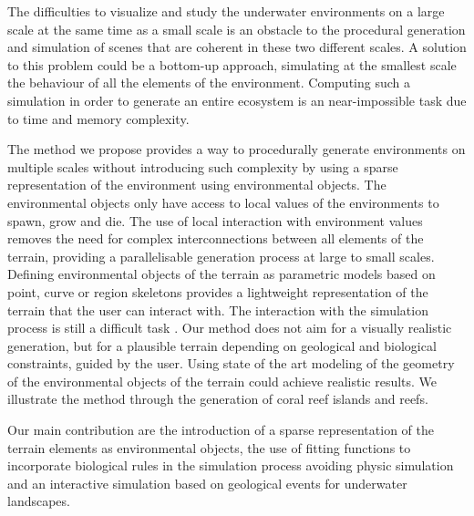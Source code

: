 The difficulties to visualize and study the underwater environments on a large scale at the same time as a small scale is an obstacle to the procedural generation and simulation of scenes that are coherent in these two different scales. 
A solution to this problem could be a bottom-up approach, simulating at the smallest scale the behaviour of all the elements of the environment. Computing such a simulation in order to generate an entire ecosystem is an near-impossible task due to time and memory complexity. 

The method we propose provides a way to procedurally generate environments on multiple scales without introducing such complexity by using a sparse representation of the environment using environmental objects.
The environmental objects only have access to local values of the environments to spawn, grow and die. The use of local interaction with environment values removes the need for complex interconnections between all elements of the terrain, providing a parallelisable generation process at large to small scales.
Defining environmental objects of the terrain as parametric models based on point, curve or region skeletons provides a lightweight representation of the terrain that the user can interact with. The interaction with the simulation process is still a difficult task \cite{Smelik2014}.
Our method does not aim for a visually realistic generation, but for a plausible terrain depending on geological and biological constraints, guided by the user. Using state of the art modeling of the geometry of the environmental objects of the terrain could achieve realistic results. We illustrate the method through the generation of coral reef islands and reefs.

Our main contribution are the introduction of a sparse representation of the terrain elements as environmental objects, the use of fitting functions to incorporate biological rules in the simulation process avoiding physic simulation and an interactive simulation based on geological events for underwater landscapes.


